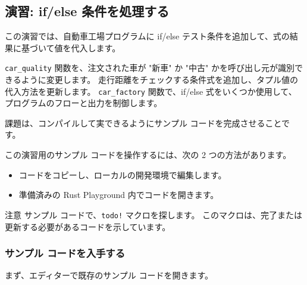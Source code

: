 \subsection{演習: if/else 条件を処理する}

この演習では、自動車工場プログラムに if/else テスト条件を追加して、式の結果に基づいて値を代入します。

\texttt{car\_quality} 関数を、注文された車が "新車" か "中古" かを呼び出し元が識別できるように変更します。 走行距離をチェックする条件式を追加し、タプル値の代入方法を更新します。 \texttt{car\_factory} 関数で、if/else 式をいくつか使用して、プログラムのフローと出力を制御します。

課題は、コンパイルして実できるようにサンプル コードを完成させることです。

この演習用のサンプル コードを操作するには、次の 2 つの方法があります。

\begin{itemize}
\item コードをコピーし、ローカルの開発環境で編集します。
\item 準備済みの Rust Playground 内でコードを開きます。
\end{itemize}

\begin{itembox}[l]{注意}
サンプル コードで、\texttt{todo!} マクロを探します。 このマクロは、完了または更新する必要があるコードを示しています。
\end{itembox}

\subsubsection{サンプル コードを入手する}

まず、エディターで既存のサンプル コードを開きます。

